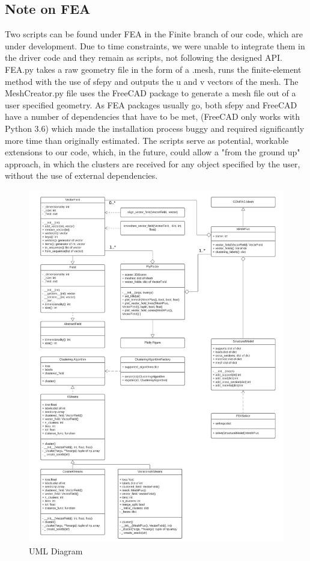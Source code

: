 \documentclass[11pt]{article}
\begin{document}
\subsection{Note on FEA}

Two scripts can be found under FEA in the Finite branch of our code, which are under development. Due to time constraints, we were unable to integrate them in the driver code and they remain as scripts, not following the designed API. FEA.py takes a raw geometry file in the form of a .mesh, runs the finite-element method with the use of sfepy and outputs the u and v vectors of the mesh. The MeshCreator.py file uses the FreeCAD package to generate a mesh file out of a user specified geometry. As FEA packages usually go, both sfepy and FreeCAD have a number of dependencies that have to be met, (FreeCAD only works with Python 3.6) which made the installation process buggy and required significantly more time than originally estimated. The scripts serve as potential, workable extensions to our code, which, in the future, could allow a "from the ground up" approach, in which the clusters are received for any object specified by the user, without the use of external dependencies.  

\begin{figure}[H]
    \centering
    \includegraphics[scale=0.54]{images/UML-Clusters-Final.jpeg}
	\caption{UML Diagram}
	\label{fig:uml}
\end{figure}
\vspace{30mm}
\end{document}
